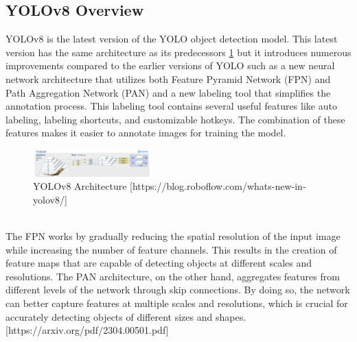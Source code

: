 \documentclass[10pt,twocolumn,letterpaper]{article}
\begin{document}
\subsection{YOLOv8 Overview}
YOLOv8 is the latest version of the YOLO object detection model. This latest version has the same architecture as its predecessors \ref{fig:YOLOv8_arch} but it introduces numerous improvements compared to the earlier versions of YOLO such as a new neural network architecture that utilizes both Feature Pyramid Network (FPN) and Path Aggregation Network (PAN) and a new labeling tool that simplifies the annotation process. This labeling tool contains several useful features like auto labeling, labeling shortcuts, and customizable hotkeys. The combination of these features makes it easier to annotate images for training the model.
\begin{figure}[h]
    \centering
    \includegraphics[width=0.4\textwidth]{figures/YOLOv8_arch.png}
    \caption{YOLOv8 Architecture [https://blog.roboflow.com/whats-new-in-yolov8/]}
    \label{fig:YOLOv8_arch}
\end{figure}
\\
The FPN works by gradually reducing the spatial resolution of the input image while increasing the number of feature channels. This results in the creation of feature maps that are capable of detecting objects at different scales and resolutions. The PAN architecture, on the other hand, aggregates features from different levels of the network through skip connections. By doing so, the network can better capture features at multiple scales and resolutions, which is crucial for accurately detecting objects of different sizes and shapes.[https://arxiv.org/pdf/2304.00501.pdf]\\
\end{document}
